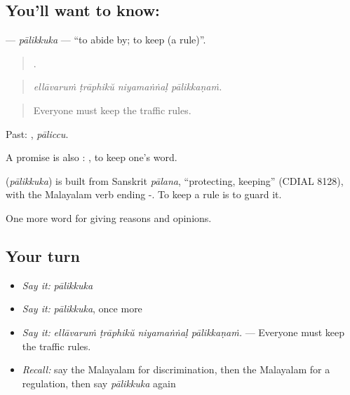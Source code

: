 \subsection*{You'll want to know: }
\textbf{} — \emph{pālikkuka} — \textquotedblleft{}to abide by; to keep (a rule)\textquotedblright{}.

\begin{quote}
   .
\end{quote}

\begin{quote}
\emph{ellāvaruṁ ṭrāphikŭ niyamaṅṅaḷ pālikkaṇaṁ.}
\end{quote}

\begin{quote}
Everyone must keep the traffic rules.
\end{quote}

Past: , \emph{pāliccu}.

A promise is also :  , to keep one's word.

\begin{cousinweb}
\textbf{} (\emph{pālikkuka}) is built from Sanskrit \emph{pālana}, \textquotedblleft{}protecting, keeping\textquotedblright{} (CDIAL 8128), with the Malayalam verb ending -. To keep a rule is to guard it.
\end{cousinweb}

\begin{grammarlens}[title={What you've built}]
One more word for giving reasons and opinions.
\end{grammarlens}

\subsection*{Your turn}
\begin{itemize}
\raggedright
  \item \emph{Say it:} \emph{pālikkuka}
  \item \emph{Say it:} \emph{pālikkuka}, once more
  \item \emph{Say it:} \emph{ellāvaruṁ ṭrāphikŭ niyamaṅṅaḷ pālikkaṇaṁ.} — Everyone must keep the traffic rules.
  \item \emph{Recall:} say the Malayalam for discrimination, then the Malayalam for a regulation, then say \emph{pālikkuka} again
\end{itemize}


